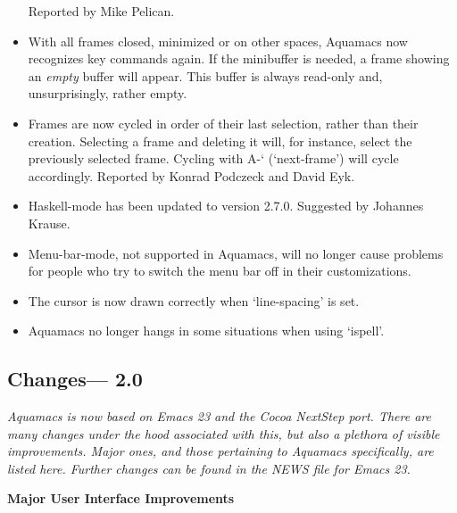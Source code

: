 \begin{itemize}
Reported by Mike Pelican.
\item With all frames closed, minimized or on other spaces, Aquamacs now recognizes key commands again.  If the minibuffer is needed, a frame showing an \emph{empty} buffer will appear.  This buffer is always read-only and, unsurprisingly, rather empty.
\item Frames are now cycled in order of their last selection, rather than their creation.  Selecting a frame and deleting it will, for instance, select the previously selected frame.  Cycling with A-` (`next-frame')  will cycle accordingly.
Reported by Konrad Podczeck and David Eyk.
\item Haskell-mode has been updated to version 2.7.0.
Suggested by Johannes Krause.
\item Menu-bar-mode, not supported in Aquamacs, will no longer cause problems for people who try to switch the menu bar off in their customizations.
\item The cursor is now drawn correctly when `line-spacing' is set.
\item Aquamacs no longer hangs in some situations when using `ispell'.
\end{itemize}



\subsection{Changes--- 2.0}


\emph{Aquamacs is now based on Emacs 23 and the Cocoa NextStep port.  There are many changes under the hood associated with this, but also a plethora of visible improvements.  Major ones, and those pertaining to Aquamacs specifically, are listed here.  Further changes can be found in the NEWS file for Emacs 23.}  


\textbf{Major User Interface Improvements}


